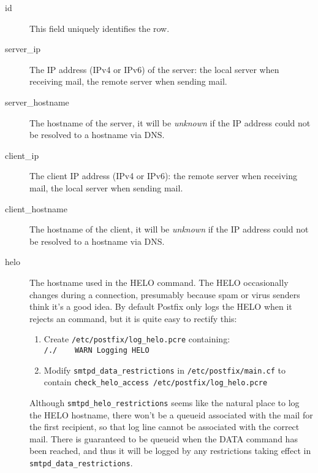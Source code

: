 \documentclass[a4paper,12pt,draft]{article}
\begin{document}
\begin{description}

    \item [id] This field uniquely identifies the row.

    \item [server\_ip] The IP address (IPv4 or IPv6) of the server: the
        local server when receiving mail, the remote server when sending
        mail.

    \item [server\_hostname] The hostname of the server, it will be
        \textit{unknown\/} if the IP address could not be resolved to a
        hostname via DNS\@.

    \item [client\_ip] The client IP address (IPv4 or IPv6): the remote
        server when receiving mail, the local server when sending mail.

    \item [client\_hostname] The hostname of the client, it will be
        \textit{unknown\/} if the IP address could not be resolved to a
        hostname via DNS\@.

    \item [helo] The hostname used in the HELO command.  The HELO
        occasionally changes during a connection, presumably because spam
        or virus senders think it's a good idea.  By default Postfix only
        logs the HELO when it rejects an \SMTP{} command, but it is quite
        easy to rectify this: 

\label{logging helo}

        \begin{enumerate}

            \item Create \texttt{/etc/postfix/log\_helo.pcre}
                containing:\newline
                \hspace*{2em}\texttt{/./~~~~WARN~Logging~HELO}

            \item Modify \texttt{smtpd\_data\_restrictions} in
                \texttt{/etc/postfix/main.cf} to contain\newline
                \hspace*{2em}\texttt{check\_helo\_access~/etc/postfix/log\_helo.pcre}

        \end{enumerate}

        Although \texttt{smtpd\_helo\_restrictions} seems like the natural
        place to log the HELO hostname, there won't be a queueid associated
        with the mail for the first recipient, so that log line cannot be
        associated with the correct mail.  There is guaranteed to be
        queueid when the DATA command has been reached, and thus it will be
        logged by any restrictions taking effect in
        \texttt{smtpd\_data\_restrictions}.


\end{description}
\end{document}
